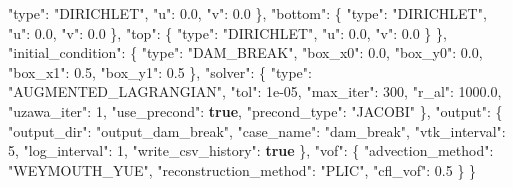 \documentclass[
  10pt,
]{article}
\newenvironment{Shaded}{}{}
\newcommand{\DataTypeTok}[1]{\textcolor[rgb]{0.56,0.13,0.00}{#1}}
\newcommand{\DecValTok}[1]{\textcolor[rgb]{0.25,0.63,0.44}{#1}}
\newcommand{\FloatTok}[1]{\textcolor[rgb]{0.25,0.63,0.44}{#1}}
\newcommand{\FunctionTok}[1]{\textcolor[rgb]{0.02,0.16,0.49}{#1}}
\newcommand{\KeywordTok}[1]{\textcolor[rgb]{0.00,0.44,0.13}{\textbf{#1}}}
\newcommand{\StringTok}[1]{\textcolor[rgb]{0.25,0.44,0.63}{#1}}
\begin{document}
\begin{Shaded}
\begin{Highlighting}[]
      \DataTypeTok{"type"}\FunctionTok{:} \StringTok{"DIRICHLET"}\FunctionTok{,}
      \DataTypeTok{"u"}\FunctionTok{:} \FloatTok{0.0}\FunctionTok{,}
      \DataTypeTok{"v"}\FunctionTok{:} \FloatTok{0.0}
    \FunctionTok{\},}
    \DataTypeTok{"bottom"}\FunctionTok{:} \FunctionTok{\{}
      \DataTypeTok{"type"}\FunctionTok{:} \StringTok{"DIRICHLET"}\FunctionTok{,}
      \DataTypeTok{"u"}\FunctionTok{:} \FloatTok{0.0}\FunctionTok{,}
      \DataTypeTok{"v"}\FunctionTok{:} \FloatTok{0.0}
    \FunctionTok{\},}
    \DataTypeTok{"top"}\FunctionTok{:} \FunctionTok{\{}
      \DataTypeTok{"type"}\FunctionTok{:} \StringTok{"DIRICHLET"}\FunctionTok{,}
      \DataTypeTok{"u"}\FunctionTok{:} \FloatTok{0.0}\FunctionTok{,}
      \DataTypeTok{"v"}\FunctionTok{:} \FloatTok{0.0}
    \FunctionTok{\}}
  \FunctionTok{\},}
  \DataTypeTok{"initial\_condition"}\FunctionTok{:} \FunctionTok{\{}
    \DataTypeTok{"type"}\FunctionTok{:} \StringTok{"DAM\_BREAK"}\FunctionTok{,}
    \DataTypeTok{"box\_x0"}\FunctionTok{:} \FloatTok{0.0}\FunctionTok{,}
    \DataTypeTok{"box\_y0"}\FunctionTok{:} \FloatTok{0.0}\FunctionTok{,}
    \DataTypeTok{"box\_x1"}\FunctionTok{:} \FloatTok{0.5}\FunctionTok{,}
    \DataTypeTok{"box\_y1"}\FunctionTok{:} \FloatTok{0.5}
  \FunctionTok{\},}
  \DataTypeTok{"solver"}\FunctionTok{:} \FunctionTok{\{}
    \DataTypeTok{"type"}\FunctionTok{:} \StringTok{"AUGMENTED\_LAGRANGIAN"}\FunctionTok{,}
    \DataTypeTok{"tol"}\FunctionTok{:} \DecValTok{1e{-}05}\FunctionTok{,}
    \DataTypeTok{"max\_iter"}\FunctionTok{:} \DecValTok{300}\FunctionTok{,}
    \DataTypeTok{"r\_al"}\FunctionTok{:} \FloatTok{1000.0}\FunctionTok{,}
    \DataTypeTok{"uzawa\_iter"}\FunctionTok{:} \DecValTok{1}\FunctionTok{,}
    \DataTypeTok{"use\_precond"}\FunctionTok{:} \KeywordTok{true}\FunctionTok{,}
    \DataTypeTok{"precond\_type"}\FunctionTok{:} \StringTok{"JACOBI"}
  \FunctionTok{\},}
  \DataTypeTok{"output"}\FunctionTok{:} \FunctionTok{\{}
    \DataTypeTok{"output\_dir"}\FunctionTok{:} \StringTok{"output\_dam\_break"}\FunctionTok{,}
    \DataTypeTok{"case\_name"}\FunctionTok{:} \StringTok{"dam\_break"}\FunctionTok{,}
    \DataTypeTok{"vtk\_interval"}\FunctionTok{:} \DecValTok{5}\FunctionTok{,}
    \DataTypeTok{"log\_interval"}\FunctionTok{:} \DecValTok{1}\FunctionTok{,}
    \DataTypeTok{"write\_csv\_history"}\FunctionTok{:} \KeywordTok{true}
  \FunctionTok{\},}
  \DataTypeTok{"vof"}\FunctionTok{:} \FunctionTok{\{}
    \DataTypeTok{"advection\_method"}\FunctionTok{:} \StringTok{"WEYMOUTH\_YUE"}\FunctionTok{,}
    \DataTypeTok{"reconstruction\_method"}\FunctionTok{:} \StringTok{"PLIC"}\FunctionTok{,}
    \DataTypeTok{"cfl\_vof"}\FunctionTok{:} \FloatTok{0.5}
  \FunctionTok{\}}
\FunctionTok{\}}
\end{Highlighting}
\end{Shaded}
\end{document}
